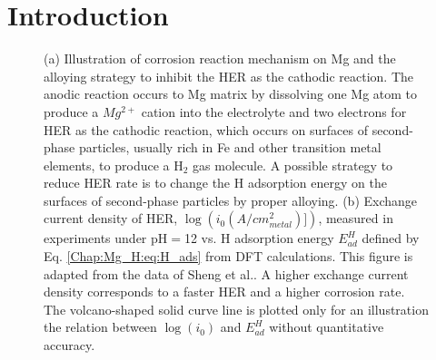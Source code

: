 \section{Introduction}

\begingroup
\begin{figure}[!ht]
  \centering
  \label{Chap:Mg_H:fig:1a}
  \label{Chap:Mg_H:fig:1b}
\caption[Illustration of corrosion reaction mechanism on Mg and the alloying strategy to inhibit \ac{HER}]{(a) Illustration of corrosion reaction mechanism on Mg and the alloying strategy to inhibit the \ac{HER} as the cathodic reaction. The anodic reaction occurs to Mg matrix by dissolving one Mg atom to produce a $Mg^{2+}$ cation into the electrolyte and two electrons for HER as the cathodic reaction, which occurs on surfaces of second-phase particles, usually rich in Fe and other transition metal elements, to produce a $\text{H}_\text{2}$ gas molecule. A possible strategy to reduce \ac{HER} rate is to change the H adsorption energy on the surfaces of second-phase particles by proper alloying. (b) Exchange current density of \ac{HER}, $\log(i_0(A/cm^2_{metal})])$, measured in experiments under pH$=$12 vs. H adsorption energy $E_{ad}^H$ defined by Eq. \ref{Chap:Mg_H:eq:H_ads} from \ac{DFT} calculations. This figure is adapted from the data of Sheng et al.\cite{sheng2013correlating}. A higher exchange current density corresponds to a faster \ac{HER} and a higher corrosion rate. The volcano-shaped solid curve line is plotted only for an illustration the relation between $\log(i_0)$ and $E_{ad}^H$ without quantitative accuracy.}
  \label{Chap:Mg_H:fig1}
\end{figure}
\endgroup

